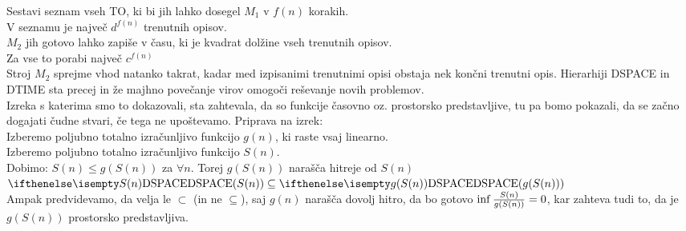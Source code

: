 \documentclass[10pt,a4paper,oneside]{book}
\begin{document}
\begin{neurejeno}
{{Sestavi seznam vseh TO, ki bi jih lahko dosegel $M_1$ v $f(n)$ korakih.\\
V seznamu je največ $d^{f(n)}$ trenutnih opisov.\\
$M_2$ jih gotovo lahko zapiše v času, ki je kvadrat dolžine vseh trenutnih opisov.\\%
Za vse to porabi največ $c^{f(n)}$\\
Stroj $M_2$ sprejme vhod natanko takrat, kadar med izpisanimi trenutnimi opisi obstaja nek končni trenutni opis.
}
}
Hierarhiji DSPACE in DTIME sta precej  in že majhno povečanje virov omogoči reševanje novih problemov.\\%
Izreka s katerima smo to dokazovali, sta zahtevala, da so funkcije časovno oz. prostorsko predstavljive, tu pa bomo pokazali, da se začno dogajati čudne stvari, če tega ne upoštevamo.
\br
Priprava na izrek:\\
Izberemo poljubno totalno izračunljivo funkcijo $g(n)$, ki raste vsaj linearno.\\
Izberemo poljubno totalno izračunljivo funkcijo $S(n)$.\\
Dobimo: $S(n) \leq g(S(n))$ za $\forall n$. Torej $g(S(n))$ narašča hitreje od $S(n)$\\
$\DSPACE{S(n)} \subseteq \DSPACE{g(S(n))}$\\
Ampak predvidevamo, da velja le $\subset$ (in ne $\subseteq$), saj $g(n)$ narašča dovolj hitro, da bo gotovo $\inf {S(n) \over g(S(n))} = 0$, kar zahteva tudi to, da je $g(S(n))$ prostorsko predstavljiva.

\end{neurejeno}
\end{document}
